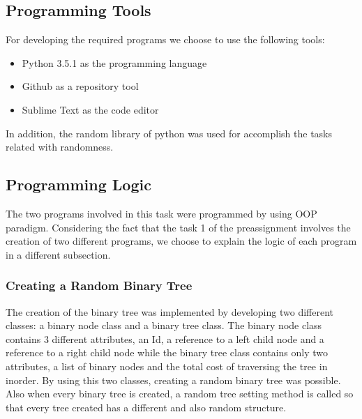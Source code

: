 \documentclass[12p]{report}
\begin{document}
  \subsection{Programming Tools}
For developing the required programs we choose to use the following tools:

\begin{itemize}
  \item Python 3.5.1 as the programming language
  \item Github as a repository tool
  \item Sublime Text as the code editor
\end{itemize}

In addition, the random library of python was used for accomplish the tasks related with randomness.



  \subsection{Programming Logic}
The two programs involved in this task were programmed by using OOP paradigm.
Considering the fact that the task 1 of the preassignment involves the creation of two different programs, we choose to explain the logic of each program in a different subsection. 


  \subsubsection{Creating a Random Binary Tree}

The creation of the binary tree was implemented by developing two different classes: a binary node class and a binary tree class. The binary node class contains 3 different attributes, an Id, a reference to a left child node and a reference to a right child node while the binary tree class contains only two attributes, a list of binary nodes and the total cost of traversing the tree in inorder. By using this two classes, creating a random binary tree was possible. Also when every binary tree is created, a random tree setting method is called so that every tree created has a different and also random structure.

\bigskip
\end{document}
